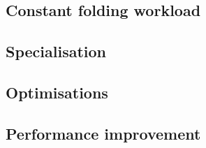 \subsection{Constant folding workload}
\label{sec:specialising-pattern-rewriting-workload}




\subsection{Specialisation}
\label{sec:specialising-pattern-rewriting-specialisation}





\subsection{Optimisations}
\label{sec:specialising-pattern-rewriting-optimisations}










\subsection{Performance improvement}
\label{sec:specialising-pattern-rewriting-performance}





